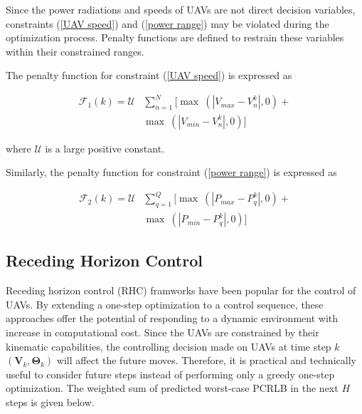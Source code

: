 \documentclass[12pt,journal,draftclsnofoot,onecolumn]{IEEEtran}
\begin{document}
Since the power radiations and speeds of UAVs are not direct decision variables, constraints (\ref{UAV speed}) and (\ref{power range}) may be violated during the optimization process. Penalty functions are defined to restrain these variables within their constrained ranges.

The penalty function for constraint (\ref{UAV speed}) is expressed as

\begin{equation}
	\begin{aligned}
		\mathcal{F}_1(k) = \mathcal{U}&\sum_{n=1}^{N}[\max\ (|V_{max}-V_n^k|,0)+\\
		&\max\ (|V_{min}-V_n^k|,0)]
	\end{aligned}	
\end{equation}

where $\mathcal{U}$ is a large positive constant.

Similarly, the penalty function for constraint (\ref{power range}) is expressed as

\begin{equation}
	\begin{aligned}
		\mathcal{F}_2(k) = \mathcal{U}&\sum_{q=1}^{Q}[\max\ (|P_{max}-P_q^k|,0)+\\
		&\max\ (|P_{min}-P_q^k|,0)]
	\end{aligned}	
\end{equation}





\subsection{Receding Horizon Control}
Receding horizon control (RHC) framworks have been popular for the control of UAVs. By extending a one-step optimization to a control sequence, these approaches offer the potential of responding to a dynamic environment\cite{frew2005receding} with increase in computational cost.
Since the UAVs are constrained by their kinematic capabilities, the controlling decision made on UAVs at time step $k$ $(\mathbf{V}_k,\mathbf{\Theta}_k)$ will affect the future moves. Therefore, it is practical and technically useful to consider future steps instead of performing only a greedy one-step optimization.
The weighted sum of predicted worst-case PCRLB in the next $H$ steps is given below.
\end{document}
